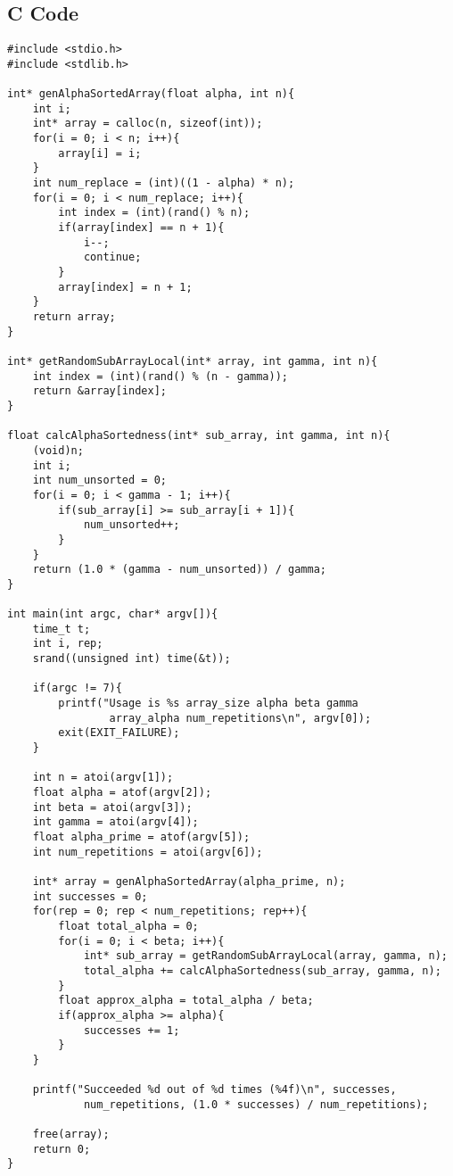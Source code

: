 \documentclass{article}
\begin{document}
\subsection{C Code}
\begin{lstlisting}
#include <stdio.h>
#include <stdlib.h>

int* genAlphaSortedArray(float alpha, int n){
    int i;
    int* array = calloc(n, sizeof(int));
    for(i = 0; i < n; i++){
        array[i] = i;
    }
    int num_replace = (int)((1 - alpha) * n);
    for(i = 0; i < num_replace; i++){
        int index = (int)(rand() % n);
        if(array[index] == n + 1){
            i--;
            continue;
        }
        array[index] = n + 1;
    }
    return array;
}

int* getRandomSubArrayLocal(int* array, int gamma, int n){
    int index = (int)(rand() % (n - gamma));
    return &array[index];
}

float calcAlphaSortedness(int* sub_array, int gamma, int n){
    (void)n;
    int i;
    int num_unsorted = 0;
    for(i = 0; i < gamma - 1; i++){
        if(sub_array[i] >= sub_array[i + 1]){
            num_unsorted++;
        }
    }
    return (1.0 * (gamma - num_unsorted)) / gamma;
}

int main(int argc, char* argv[]){
    time_t t;
    int i, rep;
    srand((unsigned int) time(&t));

    if(argc != 7){
        printf("Usage is %s array_size alpha beta gamma 
                array_alpha num_repetitions\n", argv[0]);
        exit(EXIT_FAILURE);
    }

    int n = atoi(argv[1]);
    float alpha = atof(argv[2]);
    int beta = atoi(argv[3]);
    int gamma = atoi(argv[4]);
    float alpha_prime = atof(argv[5]);
    int num_repetitions = atoi(argv[6]);

    int* array = genAlphaSortedArray(alpha_prime, n);
    int successes = 0;
    for(rep = 0; rep < num_repetitions; rep++){
        float total_alpha = 0;
        for(i = 0; i < beta; i++){
            int* sub_array = getRandomSubArrayLocal(array, gamma, n);
            total_alpha += calcAlphaSortedness(sub_array, gamma, n);
        }
        float approx_alpha = total_alpha / beta;
        if(approx_alpha >= alpha){
            successes += 1;
        }
    }
    
    printf("Succeeded %d out of %d times (%4f)\n", successes, 
            num_repetitions, (1.0 * successes) / num_repetitions);

    free(array);
    return 0;
}
\end{lstlisting}
\end{document}
